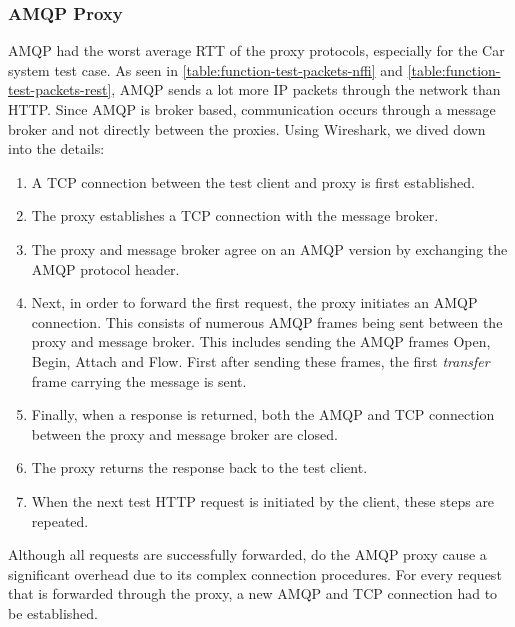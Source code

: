 \subsubsection{AMQP Proxy}

AMQP had the worst average RTT of the proxy protocols, especially for the Car
system test case. As seen in \cref{table:function-test-packets-nffi} and
\cref{table:function-test-packets-rest}, AMQP sends a lot more IP packets
through the network than HTTP. Since AMQP is broker based, communication occurs
through a message broker and not directly between the proxies. Using Wireshark,
we dived down into the details:

\begin{enumerate}

	\item A TCP connection between the test client and  proxy is first established.

    \item The proxy establishes a TCP connection with the message broker.

    \item The proxy and message broker agree on an AMQP version by exchanging
    the AMQP protocol header.

	 \item Next, in order to forward the first request, the proxy initiates an AMQP
	 connection. This consists of numerous AMQP frames being sent between the proxy
	 and message broker. This includes sending the AMQP frames Open, Begin, Attach
	 and Flow.  First after sending these frames, the first \textit{transfer} frame
	 carrying the message is sent.

     \item Finally, when a response is returned, both the AMQP and TCP connection
     between the proxy and message broker are closed.

     \item The proxy returns the response back to the test client.

     \item When the next test HTTP request is initiated by the client, these
     steps are repeated.

\end{enumerate}

Although all requests are successfully forwarded, do the AMQP proxy cause a
significant overhead due to its complex connection procedures. For every request
that is forwarded through the proxy, a new AMQP and TCP connection had to be
established.


